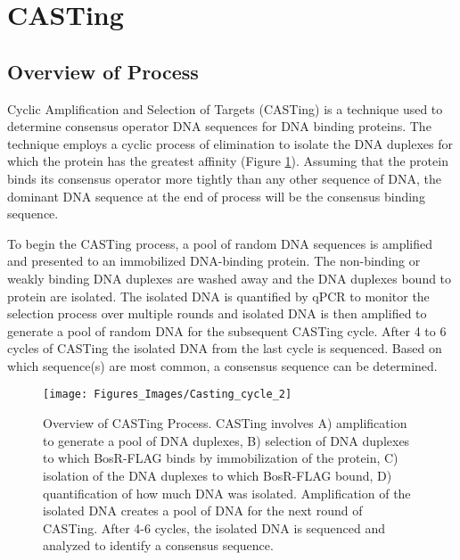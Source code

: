 \documentclass[12pt,twoside]{reedthesis}
\begin{document}
\clearpage



  
 

   
  
    \section{CASTing} 
    \subsection{Overview of Process}
    Cyclic Amplification and Selection of Targets (CASTing) is a technique used to determine consensus operator DNA sequences for DNA binding proteins. The technique employs a cyclic process of elimination to isolate the DNA duplexes for which the protein has the greatest affinity (Figure \ref{overallcastingscheme}). Assuming that the protein binds its consensus operator more tightly than any other sequence of DNA, the dominant DNA sequence at the end of process will be the consensus binding sequence. 
    
    To begin the CASTing process, a pool of random DNA sequences is amplified and presented to an immobilized DNA-binding protein. The non-binding or weakly binding DNA duplexes are washed away and the DNA duplexes bound to protein are isolated. The isolated DNA is quantified by qPCR to monitor the selection process over multiple rounds and isolated DNA is then amplified to generate a pool of random DNA for the subsequent CASTing cycle. After 4 to 6 cycles of CASTing the isolated DNA from the last cycle is sequenced. Based on which sequence(s) are most common, a consensus sequence can be determined. 
      	
      	\clearpage 
    	
          	\begin{figure}[[h!tbp]
          		\centering
          		\texttt{[image: Figures\_Images/Casting\_cycle\_2]}
          		\caption[CASTing Overall Cycle Scheme]{Overview of CASTing  Process. CASTing involves A) amplification to generate a pool of DNA duplexes, B) selection of DNA duplexes to which BosR-FLAG binds by immobilization of the protein, C) isolation of the DNA duplexes to which BosR-FLAG bound, D) quantification of how much DNA was isolated. Amplification of the isolated DNA creates a pool of DNA for the next round of CASTing. After 4-6 cycles, the isolated DNA is sequenced and analyzed to identify a consensus sequence.}
          		\label{overallcastingscheme}
          	\end{figure}
          	
\end{document}
